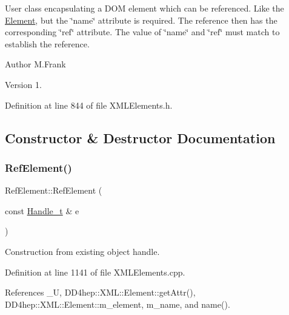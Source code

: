 User class encapsulating a D\+OM element which can be referenced. Like the \hyperlink{class_d_d4hep_1_1_x_m_l_1_1_element}{Element}, but the \char`\"{}name\char`\"{} attribute is required. The reference then has the corresponding \char`\"{}ref\char`\"{} attribute. The value of \char`\"{}name\char`\"{} and \char`\"{}ref\char`\"{} must match to establish the reference.

\begin{DoxyAuthor}{Author}
M.\+Frank 
\end{DoxyAuthor}
\begin{DoxyVersion}{Version}
1. 
\end{DoxyVersion}


Definition at line 844 of file X\+M\+L\+Elements.\+h.



\subsection{Constructor \& Destructor Documentation}
\hypertarget{class_d_d4hep_1_1_x_m_l_1_1_ref_element_a59a0e1ae7ebec907fd7df64528fcb654}{}\label{class_d_d4hep_1_1_x_m_l_1_1_ref_element_a59a0e1ae7ebec907fd7df64528fcb654} 
\subsubsection{\texorpdfstring{Ref\+Element()}{RefElement()}\hspace{0.1cm}{\footnotesize\ttfamily [1/3]}}
{\footnotesize\ttfamily Ref\+Element\+::\+Ref\+Element (\begin{DoxyParamCaption}\item[{const \hyperlink{class_d_d4hep_1_1_x_m_l_1_1_handle__t}{Handle\+\_\+t} \&}]{e }\end{DoxyParamCaption})}



Construction from existing object handle. 



Definition at line 1141 of file X\+M\+L\+Elements.\+cpp.



References \+\_\+U, D\+D4hep\+::\+X\+M\+L\+::\+Element\+::get\+Attr(), D\+D4hep\+::\+X\+M\+L\+::\+Element\+::m\+\_\+element, m\+\_\+name, and name().

